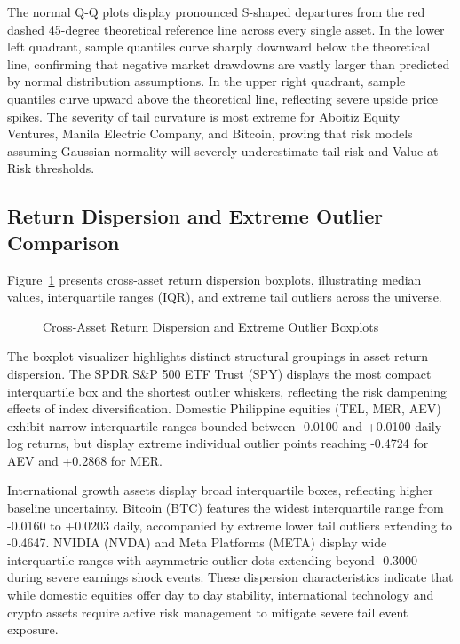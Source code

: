 The normal Q-Q plots display pronounced S-shaped departures from the red dashed 45-degree theoretical reference line across every single asset. In the lower left quadrant, sample quantiles curve sharply downward below the theoretical line, confirming that negative market drawdowns are vastly larger than predicted by normal distribution assumptions. In the upper right quadrant, sample quantiles curve upward above the theoretical line, reflecting severe upside price spikes. The severity of tail curvature is most extreme for Aboitiz Equity Ventures, Manila Electric Company, and Bitcoin, proving that risk models assuming Gaussian normality will severely underestimate tail risk and Value at Risk thresholds.

\subsection{Return Dispersion and Extreme Outlier Comparison}

Figure~\ref{fig:boxplots} presents cross-asset return dispersion boxplots, illustrating median values, interquartile ranges (IQR), and extreme tail outliers across the universe.

\begin{figure}[H]
  \centering
  \caption{Cross-Asset Return Dispersion and Extreme Outlier Boxplots}
  \label{fig:boxplots}
\end{figure}

The boxplot visualizer highlights distinct structural groupings in asset return dispersion. The SPDR S\&P 500 ETF Trust (SPY) displays the most compact interquartile box and the shortest outlier whiskers, reflecting the risk dampening effects of index diversification. Domestic Philippine equities (TEL, MER, AEV) exhibit narrow interquartile ranges bounded between -0.0100 and +0.0100 daily log returns, but display extreme individual outlier points reaching -0.4724 for AEV and +0.2868 for MER.

International growth assets display broad interquartile boxes, reflecting higher baseline uncertainty. Bitcoin (BTC) features the widest interquartile range from -0.0160 to +0.0203 daily, accompanied by extreme lower tail outliers extending to -0.4647. NVIDIA (NVDA) and Meta Platforms (META) display wide interquartile ranges with asymmetric outlier dots extending beyond -0.3000 during severe earnings shock events. These dispersion characteristics indicate that while domestic equities offer day to day stability, international technology and crypto assets require active risk management to mitigate severe tail event exposure.

